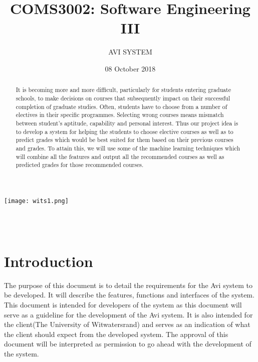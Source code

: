 \documentclass[10pt]{article}
\author{AVI SYSTEM }
\title {COMS3002: Software Engineering III}
\date{ 08 October 2018}
\begin{document}
\maketitle


\begin{center}
\texttt{[image: wits1.png]}
\end{center} \\ \\

\newpage

\tableofcontents

\newpage

\begin{abstract}
It is becoming more and more difficult, particularly for students entering graduate schools, to make decisions
on courses that\label{Chapter1}  subsequently impact on their successful completion of graduate studies. Often, students have
to choose from a number of electives in their specific programmes. Selecting wrong courses means mismatch between student’s
aptitude, capability and personal interest. Thus our project idea is to develop a system for helping the students to choose elective courses as well as to predict grades which would be best suited for them based on their previous courses and grades. To attain this, we will use some of the machine learning techniques which will combine all the features and output all the recommended courses as well as predicted grades for those recommended courses.
\end{abstract}



\section{Introduction}
\label{Chapter1} 

The purpose of this document is to detail the requirements for the Avi system to be developed. It will describe the features, functions and interfaces of the system. This document is intended for developers of the system as this document will serve as a guideline for the development of the Avi system. It is also intended for the client(The University of Witwatersrand) and serves as an indication of what the client should expect from the developed system. The approval of this document will be interpreted as permission to go ahead with the development of the system.
\end{document}
